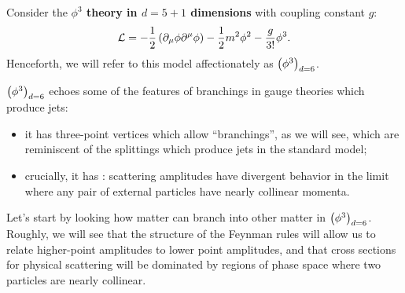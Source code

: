 
\fi


\newcommand{\phicubedsix}{\ensuremath{\le(\phi^3\ri)_{d=6}}}


Consider the \textbf{\(\phi^3\) theory in \(d=5+1\) dimensions} with coupling constant \(g\):
\begin{align}
    \mathcal{L}
    =
    -\frac{1}{2}\left(\partial_\mu \phi \partial^\mu \phi\right)
    -
    \frac{1}{2}m^2 \phi^2
    -
    \frac{g}{3!}\phi^3
    .
\end{align}
Henceforth, we will refer to this model affectionately as \phicubedsix.

\phicubedsix{} echoes some of the features of branchings in gauge theories which produce jets:
\begin{itemize}
    \item
    it has three-point vertices which allow ``branchings'', as we will see, which are reminiscent of the splittings which produce jets in the standard model;

    \item
    crucially, it has :
    scattering amplitudes have divergent behavior in the limit where any pair of external particles have nearly collinear momenta.
\end{itemize}


Let's start by looking how matter can branch into other matter in \phicubedsix{}.
%
Roughly, we will see that the structure of the Feynman rules will allow us to relate higher-point amplitudes to lower point amplitudes, and that cross sections for physical scattering will be dominated by regions of phase space where two particles are nearly collinear.


